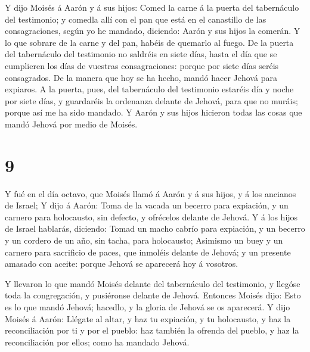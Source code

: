  Y dijo Moisés á Aarón y á sus hijos: Comed la carne á la
puerta del tabernáculo del testimonio; y comedla allí con el pan que
está en el canastillo de las consagraciones, según yo he mandado,
diciendo: Aarón y sus hijos la comerán.  Y lo que sobrare
de la carne y del pan, habéis de quemarlo al fuego.  De la
puerta del tabernáculo del testimonio no saldréis en siete días, hasta
el día que se cumplieren los días de vuestras consagraciones: porque por
siete días seréis consagrados.  De la manera que hoy se ha
hecho, mandó hacer Jehová para expiaros.  A la puerta,
pues, del tabernáculo del testimonio estaréis día y noche por siete
días, y guardaréis la ordenanza delante de Jehová, para que no muráis;
porque así me ha sido mandado.  Y Aarón y sus hijos
hicieron todas las cosas que mandó Jehová por medio de Moisés.

\hypertarget{section-8}{%
\section{9}\label{section-8}}

 Y fué en el día octavo, que Moisés llamó á Aarón y á sus
hijos, y á los ancianos de Israel;  Y dijo á Aarón: Toma de
la vacada un becerro para expiación, y un carnero para holocausto, sin
defecto, y ofrécelos delante de Jehová.  Y á los hijos de
Israel hablarás, diciendo: Tomad un macho cabrío para expiación, y un
becerro y un cordero de un año, sin tacha, para holocausto; 
Asimismo un buey y un carnero para sacrificio de paces, que inmoléis
delante de Jehová; y un presente amasado con aceite: porque Jehová se
aparecerá hoy á vosotros.

 Y llevaron lo que mandó Moisés delante del tabernáculo del
testimonio, y llegóse toda la congregación, y pusiéronse delante de
Jehová.  Entonces Moisés dijo: Esto es lo que mandó Jehová;
hacedlo, y la gloria de Jehová se os aparecerá.  Y dijo
Moisés á Aarón: Llégate al altar, y haz tu expiación, y tu holocausto, y
haz la reconciliación por ti y por el pueblo: haz también la ofrenda del
pueblo, y haz la reconciliación por ellos; como ha mandado Jehová.

